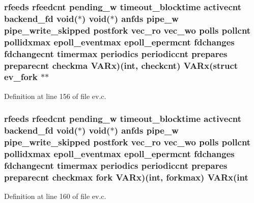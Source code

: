 \hypertarget{structev__loop_aae9a196e339bc7c28378d949673d68db}{
\subsubsection[{\-V\-A\-Rx}]{ {\bf rfeeds} {\bf rfeedcnt} {\bf pending\-\_\-w} {\bf timeout\-\_\-blocktime} {\bf activecnt} {\bf backend\-\_\-fd} void($\ast$) void($\ast$) {\bf anfds} {\bf pipe\-\_\-w} {\bf pipe\-\_\-write\-\_\-skipped} {\bf postfork} {\bf vec\-\_\-ro} {\bf vec\-\_\-wo} {\bf polls} {\bf pollcnt} {\bf pollidxmax} {\bf epoll\-\_\-eventmax} {\bf epoll\-\_\-epermcnt} {\bf fdchanges} {\bf fdchangecnt} {\bf timermax} {\bf periodics} {\bf periodiccnt} {\bf prepares} {\bf preparecnt} checkma {\bf \-V\-A\-Rx})(int, {\bf checkcnt}) {\bf \-V\-A\-Rx}(struct {\bf ev\-\_\-fork} $\ast$$\ast$}}\label{structev__loop_aae9a196e339bc7c28378d949673d68db}


\-Definition at line 156 of file ev.\-c.

\hypertarget{structev__loop_aac7b9722eaada07e64dcabe1eb5af79f}{
\subsubsection[{\-V\-A\-Rx}]{ {\bf rfeeds} {\bf rfeedcnt} {\bf pending\-\_\-w} {\bf timeout\-\_\-blocktime} {\bf activecnt} {\bf backend\-\_\-fd} void($\ast$) void($\ast$) {\bf anfds} {\bf pipe\-\_\-w} {\bf pipe\-\_\-write\-\_\-skipped} {\bf postfork} {\bf vec\-\_\-ro} {\bf vec\-\_\-wo} {\bf polls} {\bf pollcnt} {\bf pollidxmax} {\bf epoll\-\_\-eventmax} {\bf epoll\-\_\-epermcnt} {\bf fdchanges} {\bf fdchangecnt} {\bf timermax} {\bf periodics} {\bf periodiccnt} {\bf prepares} {\bf preparecnt} {\bf checkmax} fork {\bf \-V\-A\-Rx})(int, {\bf forkmax}) {\bf \-V\-A\-Rx}(int}}\label{structev__loop_aac7b9722eaada07e64dcabe1eb5af79f}


\-Definition at line 160 of file ev.\-c.


